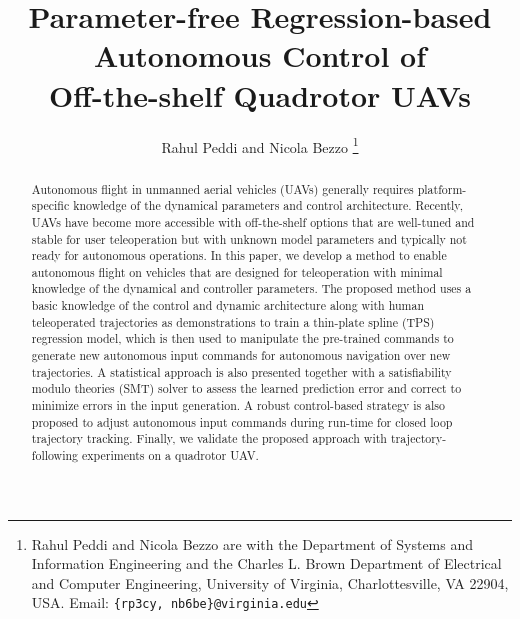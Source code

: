\documentclass[letterpaper, 10 pt, conference]{ieeeconf}  %
\begin{document}
\title{\LARGE \bf
Parameter-free Regression-based Autonomous Control of \\Off-the-shelf Quadrotor UAVs
}


\author{Rahul Peddi and Nicola Bezzo%
\thanks{Rahul Peddi and Nicola Bezzo are with the Department of Systems and Information Engineering and the Charles L. Brown Department of Electrical and Computer Engineering, University of Virginia, Charlottesville, VA 22904, USA. Email: {\tt \{rp3cy, nb6be\}@virginia.edu}}}



\maketitle
\thispagestyle{empty}
\pagestyle{empty}


\begin{abstract}
Autonomous flight in unmanned aerial vehicles (UAVs) generally requires platform-specific knowledge of the dynamical parameters and control architecture. Recently, UAVs have become more accessible with off-the-shelf options that are well-tuned and stable for user teleoperation but with unknown model parameters and typically not ready for autonomous operations. In this paper, we develop a method to enable autonomous flight on vehicles that are designed for teleoperation with minimal knowledge of the dynamical and controller parameters. The proposed method uses a basic knowledge of the control and dynamic architecture along with human teleoperated trajectories as demonstrations to train a thin-plate spline (TPS) regression model, which is then used to manipulate the pre-trained commands to generate new autonomous input commands for autonomous navigation over new trajectories. A statistical approach is also presented together with a satisfiability modulo theories (SMT) solver to assess the learned prediction error and correct to minimize errors in the input generation. A robust control-based strategy is also proposed to adjust autonomous input commands during run-time for closed loop trajectory tracking. Finally, we validate the proposed approach with trajectory-following experiments on a quadrotor UAV.

\end{abstract}


\end{document}
